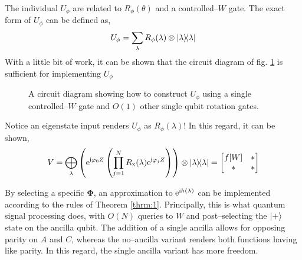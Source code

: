 \documentclass{article}
\begin{document}
The individual $U_{\phi}$ are related to $R_\phi(\theta)$ and a controlled--$W$ gate. The exact form of $U_{\phi}$ can be defined as,
\begin{equation}\label{eq:u_phi}
    U_{\phi} = \sum_\lambda R_\phi(\lambda)\otimes \ketbra{\lambda}
\end{equation}
With a little bit of work, it can be shown that the circuit diagram of fig. \ref{fig:u_phi} is sufficient for implementing $U_{\phi}$

\begin{figure}[h!]
    \centering
    \caption{A circuit diagram showing how to construct $U_{\phi}$ using a single controlled--$W$ gate and $O(1)$ other single qubit rotation gates.}
    \label{fig:u_phi}
\end{figure}

Notice an eigenstate input renders $U_{\phi}$ as $R_\phi(\lambda)$! In this regard, it can be shown,
\begin{equation}
    V = \bigoplus_{\lambda} \left(\mathrm{e}^{\mathrm{i}\varphi_0 Z} \left(\prod_{j=1}^N R_{\textsc{x}}(
    \lambda)\mathrm{e}^{\mathrm{i}\varphi_j Z} \right) \right)\otimes\ketbra{\lambda} = \begin{bmatrix}f[W] & * \\ * & *\end{bmatrix}
\end{equation}


By selecting a specific $\boldsymbol{\Phi}$, an approximation to $\mathrm{e}^{\mathrm{i} h(\lambda)}$ can be implemented according to the rules of Theorem \ref{thrm:1}. Principally, this is what quantum signal processing does, with $O(N)$ queries to $W$ and post--selecting the $\ket{+}$ state on the ancilla qubit. The addition of a single ancilla allows for opposing parity on $A$ and $C$, whereas the no--ancilla variant \cite{LC19} renders both functions having like parity. In this regard, the single ancilla variant has more freedom. 
\end{document}
